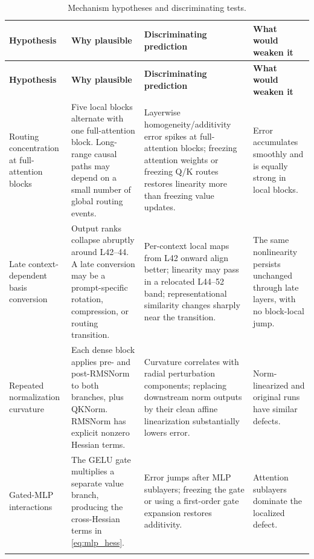 \documentclass[11pt]{article}
\theoremstyle{definition}
\theoremstyle{remark}
\begin{document}
\small
\begin{longtable}{@{}p{}p{}p{}p{}@{}}
\caption{Mechanism hypotheses and discriminating tests.}\label{tab:hypotheses}\\
\toprule
\textbf{Hypothesis} & \textbf{Why plausible} & \textbf{Discriminating prediction} & \textbf{What would weaken it}\\
\midrule
\endfirsthead
\toprule
\textbf{Hypothesis} & \textbf{Why plausible} & \textbf{Discriminating prediction} & \textbf{What would weaken it}\\
\midrule
\endhead

Routing concentration at full-attention blocks
& Five local blocks alternate with one full-attention block. Long-range causal paths may depend on a small number of global routing events.
& Layerwise homogeneity/additivity error spikes at full-attention blocks; freezing attention weights or freezing Q/K routes restores linearity more than freezing value updates.
& Error accumulates smoothly and is equally strong in local blocks.\\
\addlinespace

Late context-dependent basis conversion
& Output ranks collapse abruptly around L42--44. A late conversion may be a prompt-specific rotation, compression, or routing transition.
& Per-context local maps from L42 onward align better; linearity may pass in a relocated L44--52 band; representational similarity changes sharply near the transition.
& The same nonlinearity persists unchanged through late layers, with no block-local jump.\\
\addlinespace

Repeated normalization curvature
& Each dense block applies pre- and post-RMSNorm to both branches, plus QKNorm. RMSNorm has explicit nonzero Hessian terms.
& Curvature correlates with radial perturbation components; replacing downstream norm outputs by their clean affine linearization substantially lowers error.
& Norm-linearized and original runs have similar defects.\\
\addlinespace

Gated-MLP interactions
& The GELU gate multiplies a separate value branch, producing the cross-Hessian terms in \cref{eq:mlp_hess}.
& Error jumps after MLP sublayers; freezing the gate or using a first-order gate expansion restores additivity.
& Attention sublayers dominate the localized defect.\\
\addlinespace


\end{longtable}
\end{document}
